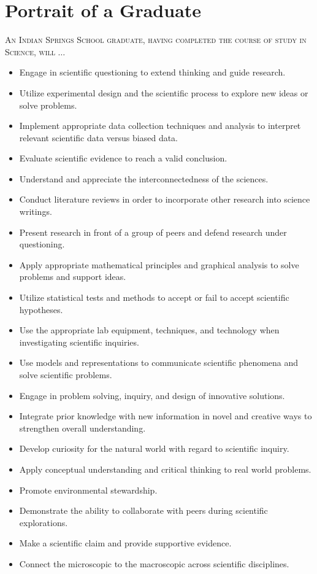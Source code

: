 \section{Portrait of a Graduate}

\textsc{An Indian Springs School graduate, having completed the course of study in Science, will} $\ldots$ 

\begin{itemize}
  \item Engage in scientific questioning  to extend thinking and guide research.
\item Utilize experimental design and the scientific process to explore new ideas or solve problems.
\item Implement appropriate data collection techniques and analysis to interpret relevant scientific data versus biased data.
\item Evaluate scientific evidence to reach a valid conclusion.
\item Understand and appreciate the interconnectedness of the sciences.
\item Conduct literature reviews in order to incorporate other research into science writings.
\item Present research in front of a group of peers and defend research under questioning.
\item Apply appropriate mathematical principles and graphical analysis to solve problems and support ideas.
\item Utilize statistical tests and methods to accept or fail to accept scientific hypotheses.
\item Use the appropriate lab equipment, techniques, and technology when investigating scientific inquiries.
\item Use models and representations to communicate scientific phenomena and solve scientific problems.
\item Engage in problem solving, inquiry, and design of innovative solutions. 
\item Integrate prior knowledge with new information in novel and creative ways to strengthen overall understanding. 
\item Develop curiosity for the natural world with regard to scientific inquiry.
\item Apply conceptual understanding and critical thinking to real world problems.
\item Promote environmental stewardship.
\item Demonstrate the ability to collaborate with peers during scientific explorations.
\item Make a scientific claim and provide supportive evidence.
\item Connect the microscopic to the macroscopic across scientific disciplines.

\end{itemize}